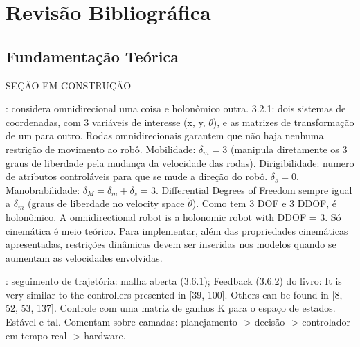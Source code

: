 \section{Revisão Bibliográfica}
\label{sec:revbib}

\subsection{Fundamentação Teórica}

SEÇÃO EM CONSTRUÇÃO

\cite{siegwart2011introduction}: considera omnidirecional uma coisa e holonômico outra. 3.2.1: dois sistemas de coordenadas, com 3 variáveis de interesse (x, y, $\theta$), e as matrizes de transformação de um para outro. Rodas omnidirecionais garantem que não haja nenhuma restrição de movimento ao robô. Mobilidade: $\delta_m = 3$ (manipula diretamente os 3 graus de liberdade pela mudança da velocidade das rodas). Dirigibilidade: numero de atributos controláveis para que se mude a direção do robô. $\delta_s = 0$. Manobrabilidade: $\delta_M = \delta_m+\delta_s = 3$. Differential Degrees of Freedom sempre igual a $\delta_m$ (graus de liberdade no velocity space $\dot\theta$). Como tem 3 DOF e 3 DDOF, é holonômico. A omnidirectional robot is a holonomic robot with DDOF = 3. Só cinemática é meio teórico. Para implementar, além das propriedades cinemáticas apresentadas, restrições dinâmicas devem ser inseridas nos modelos quando se aumentam as velocidades envolvidas.

\cite{siegwart2011introduction}: seguimento de trajetória: malha aberta (3.6.1); Feedback (3.6.2) do livro: It is very similar to the controllers presented in [39, 100]. Others can be found in [8, 52, 53, 137]. Controle com uma matriz de ganhos K para o espaço de estados. Estável e tal. Comentam sobre camadas: planejamento -> decisão -> controlador em tempo real -> hardware.

